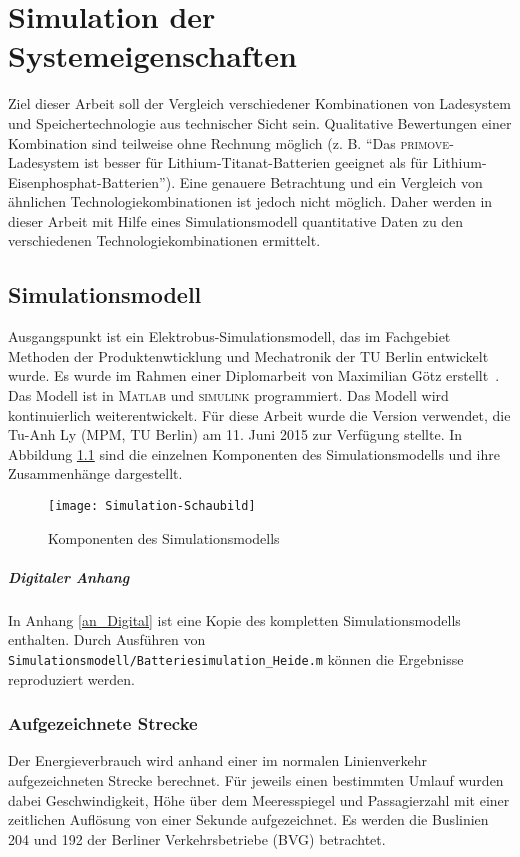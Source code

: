 \chapter{Simulation der Systemeigenschaften}
\label{chap4}
Ziel dieser Arbeit soll der Vergleich verschiedener Kombinationen von Ladesystem und Speichertechnologie aus technischer Sicht sein. Qualitative Bewertungen einer Kombination sind teilweise ohne Rechnung möglich (z. B. "`Das \textsc{primove}-Ladesystem ist besser für Lithium-Titanat-Batterien geeignet als für Lithium-Eisenphosphat-Batterien"'). Eine genauere Betrachtung und ein Vergleich von ähnlichen Technologiekombinationen ist jedoch nicht möglich. Daher werden in dieser Arbeit mit Hilfe eines Simulationsmodell quantitative Daten zu den verschiedenen Technologiekombinationen ermittelt.

\section{Simulationsmodell}
Ausgangspunkt ist ein Elektrobus-Simulationsmodell, das im Fachgebiet Methoden der Produktenwticklung und Mechatronik der TU Berlin entwickelt wurde. Es wurde im Rahmen einer Diplomarbeit von Maximilian Götz erstellt~\cite{Gotz:2013}. Das Modell ist in \textsc{Matlab} und \textsc{simulink} programmiert. Das Modell wird kontinuierlich weiterentwickelt. Für diese Arbeit wurde die Version verwendet, die Tu-Anh Ly (MPM, TU Berlin) am 11. Juni 2015 zur Verfügung stellte. In Abbildung \ref{abb_simmodell} sind die einzelnen Komponenten des Simulationsmodells und ihre Zusammenhänge dargestellt.
\begin{figure}\centering
	\texttt{[image: Simulation-Schaubild]}
	\caption{Komponenten des Simulationsmodells}
	\label{abb_simmodell}
\end{figure}

\paragraph{Digitaler Anhang} In Anhang \ref{an_Digital} ist eine Kopie des kompletten Simulationsmodells enthalten. Durch Ausführen von \texttt{Simulationsmodell/Batteriesimulation\_Heide.m} können die Ergebnisse reproduziert werden.

\subsection{Aufgezeichnete Strecke}
Der Energieverbrauch wird anhand einer im normalen Linienverkehr aufgezeichneten Strecke berechnet. Für jeweils einen bestimmten Umlauf wurden dabei Geschwindigkeit, Höhe über dem Meeresspiegel und Passagierzahl mit einer zeitlichen Auflösung von einer Sekunde aufgezeichnet. Es werden die Buslinien 204 und 192 der Berliner Verkehrsbetriebe (BVG) betrachtet.

